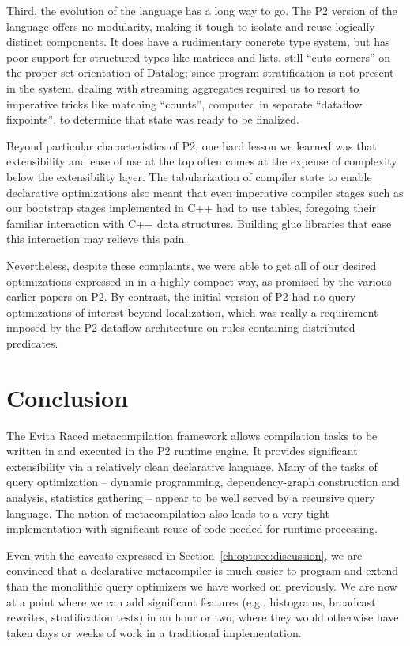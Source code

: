 Third, the evolution of the \OVERLOG language has a long way to go.  The P2
version of the language offers no modularity, making it tough to isolate and
reuse logically distinct components.  It does have a rudimentary concrete type
system, but has poor support for structured types like matrices and lists.
\OVERLOG still ``cuts corners'' on the proper set-orientation of Datalog; since
program stratification is not present in the system, dealing with streaming
aggregates required us to resort to imperative tricks like matching ``counts'',
computed in separate ``dataflow fixpoints'', to determine that state was ready
to be finalized.

Beyond particular characteristics of P2, one hard lesson we learned was that
extensibility and ease of use at the top often comes at the expense of
complexity below the extensibility layer.  The tabularization of compiler state
to enable declarative optimizations also meant that even imperative compiler
stages such as our bootstrap stages implemented in C++ had to use tables,
foregoing their familiar interaction with C++ data structures.  Building glue
libraries that ease this interaction may relieve this pain.

Nevertheless, despite these complaints, we were able to get all of our desired
optimizations expressed in \OVERLOG in a highly compact way, as promised by the
various earlier papers on P2.  By contrast, the initial version of P2 had no
query optimizations of interest beyond localization, which was really a
requirement imposed by the P2 dataflow architecture on rules containing
distributed predicates.

\section{Conclusion} 
\label{ch:opt:sec:summary} 

The Evita Raced metacompilation framework allows \OVERLOG compilation tasks to
be written in \OVERLOG and executed in the P2 runtime engine.  It provides
significant extensibility via a relatively clean declarative language.  Many of
the tasks of query optimization -- dynamic programming, dependency-graph
construction and analysis, statistics gathering -- appear to be well served by
a recursive query language.  The notion of metacompilation also leads to a very
tight implementation with significant reuse of code needed for runtime
processing.

Even with the caveats expressed in Section~\ref{ch:opt:sec:discussion}, we are
convinced that a declarative metacompiler is much easier to program and extend
than the monolithic query optimizers we have worked on previously.  We are now
at a point where we can add significant features (e.g., histograms, broadcast
rewrites, stratification tests) in an hour or two, where they would otherwise
have taken days or weeks of work in a traditional implementation.

